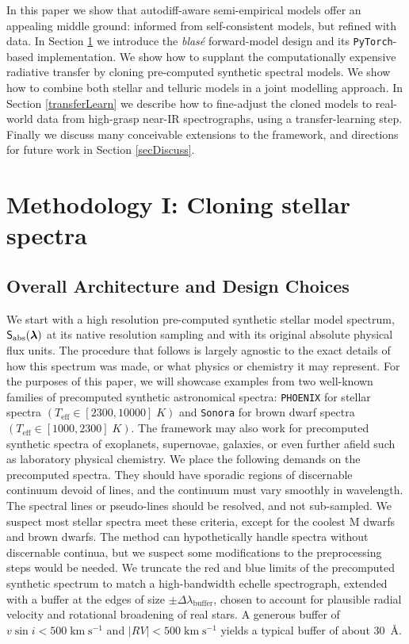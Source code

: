 \documentclass[modern]{aastex631}
\def\kmps{\mathrm{km}\;\mathrm{s}^{-1}}
\begin{document}
In this paper we show that autodiff-aware semi-empirical models offer an appealing middle ground: informed from self-consistent models, but refined with data.  In Section \ref{methodology} we introduce the \emph{blas\'e} forward-model design and its \texttt{PyTorch}-based \citep{2019arXiv191201703P} implementation.  We show how to supplant the computationally expensive radiative transfer by cloning pre-computed synthetic spectral models.  We show how to combine both stellar and telluric models in a joint modelling approach.  In Section \ref{transferLearn} we describe how to fine-adjust the cloned models to real-world data from high-grasp near-IR spectrographs, using a transfer-learning step.
Finally we discuss many conceivable extensions to the framework, and directions for future work in Section \ref{secDiscuss}.


\section{Methodology I: Cloning stellar spectra}\label{methodology}

\subsection{Overall Architecture and Design Choices}

We start with a high resolution pre-computed synthetic stellar model spectrum, $\mathsf{S}_{\rm abs}(\bm{\lambda})$ at its native resolution sampling and with its original absolute physical flux units. The procedure that follows is largely agnostic to the exact details of how this spectrum was made, or what physics or chemistry it may represent. For the purposes of this paper, we will showcase examples from two well-known families of precomputed synthetic astronomical spectra: \texttt{PHOENIX} \citep{husser13} for stellar spectra $(T_{\mathrm{eff}}\in [2300, 10000]\;K)$ and \texttt{Sonora} \citep{2021ApJ...920...85M} for brown dwarf spectra $(T_{\mathrm{eff}}\in [1000, 2300]\;K)$. The framework may also work for precomputed synthetic spectra of exoplanets, supernovae, galaxies, or even further afield such as laboratory physical chemistry.  We place the following demands on the precomputed spectra. They should have sporadic regions of discernable continuum devoid of lines, and the continuum must vary smoothly in wavelength. The spectral lines or pseudo-lines should be resolved, and not sub-sampled. We suspect most stellar spectra meet these criteria, except for the coolest M dwarfs and brown dwarfs. The method can hypothetically handle spectra without discernable continua, but we suspect some modifications to the preprocessing steps would be needed. We truncate the red and blue limits of the precomputed synthetic spectrum to match a high-bandwidth echelle spectrograph, extended with a buffer at the edges of size $\pm \Delta \lambda_{\mathrm{buffer}}$, chosen to account for plausible radial velocity and rotational broadening of real stars. A generous buffer of $v \sin{i} < 500 \;\kmps$ and $|RV|<500 \;\kmps$ yields a typical buffer of about 30~\AA.
\end{document}
